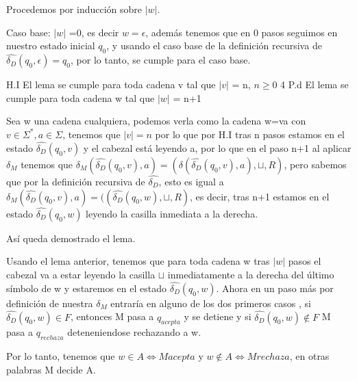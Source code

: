 \documentclass{article}
\begin{document}
\begin{enumerate}
  Procedemos por inducción sobre $|w|$.

  Caso base: $|w|$ =0, es decir $w=\epsilon$, además tenemos que en 0 pasos seguimos en nuestro estado inicial $q_0$, y usando el caso base de la definición recursiva de $\widehat{\delta_D}(q_0,\epsilon)=q_0$, por lo tanto, se cumple para el caso base.

  H.I El lema se cumple para toda cadena v tal que $|v|$ = n, $n \geq 0$
4
  P.d El lema se cumple para toda cadena w tal que $|w|$ = n+1

  Sea w una cadena cualquiera, podemos verla como la cadena w=va con $v \in \Sigma^*, a \in \Sigma$, tenemos que $|v| = n$ por lo que por H.I tras n pasos estamos en el estado $\widehat{\delta_D}(q_0,v)$ y el cabezal está leyendo a, por lo que en el paso n+1 al aplicar $\delta_M$ tenemos que $\delta_M(\widehat{\delta_D}(q_0,v),a)= (\delta(\widehat{\delta_D}(q_0,v),a),\sqcup,R)$, pero sabemos que por la definición recursiva de $\widehat{\delta_D}$, esto es igual a $\delta_M(\widehat{\delta_D}(q_0,v),a)= ((\widehat{\delta_D}(q_0,w),\sqcup,R)$, es decir, tras n+1 estamos en el estado $\widehat{\delta_D}(q_0,w)$ leyendo la casilla inmediata a la derecha.

  Así queda demostrado el lema.


  Usando el lema anterior, tenemos que para toda cadena w tras $|w|$ pasos el cabezal va a estar leyendo la casilla $\sqcup$ inmediatamente a la derecha del último símbolo de w y estaremos en el estado $\widehat{\delta_D}(q_0,w)$. Ahora en un paso más por definición de nuestra $\delta_M$ entraría en alguno de los dos primeros casos , si $\widehat{\delta_D}(q_0,w) \in F$, entonces M pasa a $q_{acepta}$ y se detiene y si $\widehat{\delta_D}(q_0,w) \notin F$ M pasa a $q_{rechaza}$ deteneniendose rechazando a w. 

  Por lo tanto, tenemos que $w \in A \Leftrightarrow M acepta $ y $w \notin A \Leftrightarrow M rechaza $, en otras palabras M decide A.
  

  
  \end{enumerate}
\end{document}
